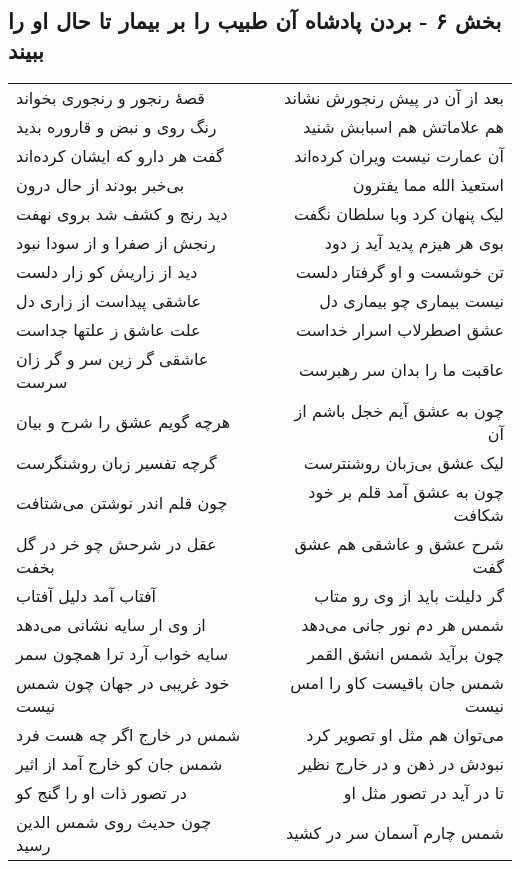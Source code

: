 \begin{center}
\section*{بخش ۶ - بردن پادشاه آن طبیب را بر بیمار تا حال او را ببیند}
\label{sec:sh006}
\begin{longtable}{l p{0.5cm} r}
قصهٔ رنجور و رنجوری بخواند
&&
بعد از آن در پیش رنجورش نشاند
\\
رنگ روی و نبض و قاروره بدید
&&
هم علاماتش هم اسبابش شنید
\\
گفت هر دارو که ایشان کرده‌اند
&&
آن عمارت نیست ویران کرده‌اند
\\
بی‌خبر بودند از حال درون
&&
استعیذ الله مما یفترون
\\
دید رنج و کشف شد بروی نهفت
&&
لیک پنهان کرد وبا سلطان نگفت
\\
رنجش از صفرا و از سودا نبود
&&
بوی هر هیزم پدید آید ز دود
\\
دید از زاریش کو زار دلست
&&
تن خوشست و او گرفتار دلست
\\
عاشقی پیداست از زاری دل
&&
نیست بیماری چو بیماری دل
\\
علت عاشق ز علتها جداست
&&
عشق اصطرلاب اسرار خداست
\\
عاشقی گر زین سر و گر زان سرست
&&
عاقبت ما را بدان سر رهبرست
\\
هرچه گویم عشق را شرح و بیان
&&
چون به عشق آیم خجل باشم از آن
\\
گرچه تفسیر زبان روشنگرست
&&
لیک عشق بی‌زبان روشنترست
\\
چون قلم اندر نوشتن می‌شتافت
&&
چون به عشق آمد قلم بر خود شکافت
\\
عقل در شرحش چو خر در گل بخفت
&&
شرح عشق و عاشقی هم عشق گفت
\\
آفتاب آمد دلیل آفتاب
&&
گر دلیلت باید از وی رو متاب
\\
از وی ار سایه نشانی می‌دهد
&&
شمس هر دم نور جانی می‌دهد
\\
سایه خواب آرد ترا همچون سمر
&&
چون برآید شمس انشق القمر
\\
خود غریبی در جهان چون شمس نیست
&&
شمس جان باقیست کاو را امس نیست
\\
شمس در خارج اگر چه هست فرد
&&
می‌توان هم مثل او تصویر کرد
\\
شمس جان کو خارج آمد از اثیر
&&
نبودش در ذهن و در خارج نظیر
\\
در تصور ذات او را گنج کو
&&
تا در آید در تصور مثل او
\\
چون حدیث روی شمس الدین رسید
&&
شمس چارم آسمان سر در کشید
\\

\end{longtable}
\end{center}
